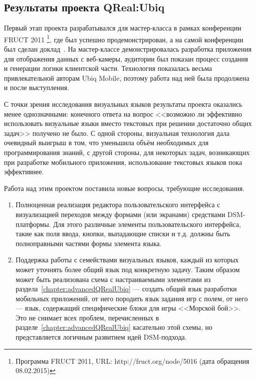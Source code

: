 \subsection{Результаты проекта QReal:Ubiq}
Первый этап проекта разрабатывался для мастер-класса в рамках конференции FRUCT 2011%
\footnote{Программа FRUCT 2011, URL: http://fruct.org/node/5016 (дата обращения 08.02.2015)}, 
где был успешно продемонстрирован, а на самой конференции был сделан доклад~\cite{bryksin2011ubiq}. 
На мастер-классе демонстрировалась разработка приложения для отображения данных 
с веб-камеры, аудитории был показан процесс создания и генерации логики клиентской 
части. Технология показалась весьма привлекательной авторам Ubiq Mobile, поэтому работа 
над ней была продолжена и после выступления.

С точки зрения исследования визуальных языков результаты проекта оказались менее однозначными: 
конечного ответа на вопрос <<возможно ли эффективно использовать визуальные языки 
вместо текстовых при решении достаточно общих задач>> получено не было. С одной стороны, 
визуальная технология дала очевидный выигрыш в том, что уменьшила объём необходимых 
для программирования знаний, с другой стороны, для некоторых задач, возникающих при 
разработке мобильного приложения, использование текстовых языков пока эффективнее. 

Работа над этим проектом поставила новые вопросы, требующие исследования. 
\begin{enumerate}
	\item Полноценная реализация редактора пользовательского интерфейса с визуализацией 
		переходов между формами (или экранами) средствами \ac{DSM}-платформы. Для этого различные 
		элементы пользовательского интерфейса, такие как поля ввода, кнопки, выпадающие 
		списки и т.д. должны быть полноправными частями формы элемента языка.
	\item Поддержка работы с семействами визуальных языков, каждый из которых может 
		уточнять более общий язык под конкретную задачу. Таким образом может быть реализована 
		схема с настраиваемыми элементами из раздела~\ref{chapter:advancedQRealUbiq} --- 
		создать общий язык разработки мобильных приложений, от него породить язык задания 
		игр с полем, от него --- язык, содержащий специфические блоки для игры <<Морской бой>>. 
		Это не снимает всех проблем, перечисленных в разделе~\ref{chapter:advancedQRealUbiq} 
		касательно этой схемы, но представляется логичным развитием идей \ac{DSM}-подхода.
\end{enumerate}